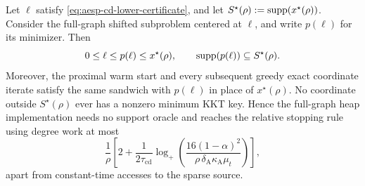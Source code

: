 \begin{theorem}
\label{thm:aesp-cd-safe-center}
Let $\ell$ satisfy \cref{eq:aesp-cd-lower-certificate}, and let
$S^\star(\rho):=\operatorname{supp}(x^\star(\rho))$.  Consider the full-graph shifted
subproblem centered at $\ell$, and write $p(\ell)$ for its minimizer.  Then
\begin{equation}
 0\leq\ell\leq p(\ell)\leq x^\star(\rho),
 \qquad
 \operatorname{supp}(p(\ell))\subseteq S^\star(\rho).
 \label{eq:aesp-cd-safe-sandwich}
\end{equation}
Moreover, the proximal warm start and every subsequent greedy exact
coordinate iterate satisfy the same sandwich with $p(\ell)$ in place of
$x^\star(\rho)$.  No coordinate outside $S^\star(\rho)$ ever has a nonzero
minimum KKT key.  Hence the full-graph heap implementation needs no support
oracle and reaches the relative stopping rule using degree work at most
\begin{equation}
 \frac1\rho\left[
 2+\frac{1}{2\tau_{\mathrm{cd}}}
 \log_+\left(
  \frac{16(1-\alpha)^2}
       {\rho\,\delta_{\mathrm A}\kappa_{\mathrm A}\mu_t}
 \right)\right],
 \label{eq:aesp-cd-safe-center-work}
\end{equation}
apart from constant-time accesses to the sparse source.
\end{theorem}

